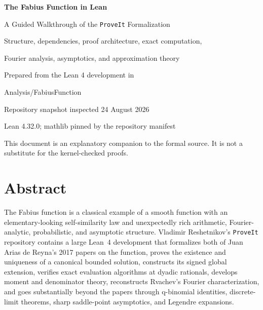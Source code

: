 \documentclass[11pt,oneside]{report}
\theoremstyle{definition}
\theoremstyle{remark}
\begin{document}
\begin{titlepage}
\centering
\vspace*{1.7cm}
{\Huge\bfseries\color{LeanDark} The Fabius Function in Lean\par}
\vspace{0.45cm}
{\LARGE\color{LeanBlue} A Guided Walkthrough of the \texttt{ProveIt} Formalization\par}
\vspace{1.2cm}
\vspace{1.1cm}

{\Large Structure, dependencies, proof architecture, exact computation,\par
Fourier analysis, asymptotics, and approximation theory\par}
\vfill
{\large Prepared from the Lean 4 development in\par}
\vspace{0.2cm}
{\ttfamily\large Analysis/FabiusFunction\par}
\vspace{0.8cm}
{\large Repository snapshot inspected 24 August 2026\par}
\vspace{0.2cm}
{\small Lean 4.32.0; mathlib pinned by the repository manifest\par}
\vfill
{\small This document is an explanatory companion to the formal source.  It is not a substitute for the kernel-checked proofs.\par}
\end{titlepage}


\chapter*{Abstract}
The Fabius function is a classical example of a smooth function with an elementary-looking self-similarity law and unexpectedly rich arithmetic, Fourier-analytic, probabilistic, and asymptotic structure.  Vladimir Reshetnikov's \texttt{ProveIt} repository contains a large Lean~4 development that formalizes both of Juan Arias de Reyna's 2017 papers on the function, proves the existence and uniqueness of a canonical bounded solution, constructs its signed global extension, verifies exact evaluation algorithms at dyadic rationals, develops moment and denominator theory, reconstructs Rvachev's Fourier characterization, and goes substantially beyond the papers through q-binomial identities, discrete-limit theorems, sharp saddle-point asymptotics, and Legendre expansions.
\end{document}
